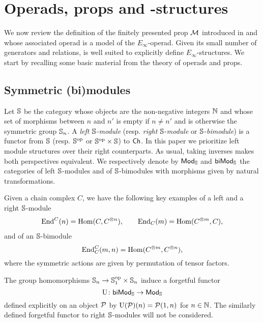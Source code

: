 \section{Operads, props and \pdfEinfty-structures} \label{s:props}

We now review the definition of the finitely presented prop $\mathcal{M}$ introduced in \cite{medina2020prop1} and whose associated operad is a model of the $E_\infty$-operad.
Given its small number of generators and relations, is well suited to explicitly define $E_\infty$-structures.
We start by recalling some basic material from the theory of operads and props.

\subsection{Symmetric (bi)modules}

Let $\mathbb{S}$ be the category whose objects are the non-negative integers $\mathbb{N}$ and whose set of morphisms between $n$ and $n'$ is empty if $n \neq n'$ and is otherwise the symmetric group $\mathbb{S}_n$.
A \textit{left $\mathbb{S}$-module} (resp. \textit{right} $\mathbb{S}$-\textit{module} or $\mathbb{S}$-\textit{bimodule}) is a functor from $\mathbb{S}$ (resp. $\mathbb{S}^{\mathrm{op}}$ or $\mathbb{S}^{\mathrm{op}} \times \mathbb{S}$) to $\mathsf{Ch}$.
In this paper we prioritize left module structures over their right counterparts.
As usual, taking inverses makes both perspectives equivalent.
We respectively denote by $\mathsf{Mod}_{\mathbb{S}}$ and $\mathsf{biMod}_{\mathbb{S}}$ the categories of left $\mathbb{S}$-modules and of $\mathbb{S}$-bimodules with morphisms given by natural transformations.

Given a chain complex $C$, we have the following key examples of a left and a right $\mathbb{S}$-module
\begin{gather*}
	\mathrm{End}^C(n) = \mathrm{Hom}(C, C^{\otimes n}), \qquad
	\mathrm{End}_C(m) = \mathrm{Hom}(C^{\otimes m}, C),
\end{gather*}
and of an $\mathbb{S}$-bimodule
\[
\mathrm{End}^C_C(m,n) = \mathrm{Hom}(C^{\otimes m}, C^{\otimes n}),
\]
where the symmetric actions are given by permutation of tensor factors.

The group homomorphisms $\mathbb{S}_n \to \mathbb{S}_1^{\mathrm{op}} \times \mathbb{S}_n$ induce a forgetful functor
\begin{equation} \label{e:forgetful}
	\operatorname{U} \colon \mathsf{biMod}_{\mathbb{S}} \to \mathsf{Mod}_{\mathbb{S}}
\end{equation}
defined explicitly on an object $\mathcal{P}$ by $\operatorname{U}(\mathcal{P})(n) = \mathcal{P}(1, n)$ for $n \in \mathbb{N}$.
The similarly defined forgetful functor to right $\mathbb{S}$-modules will not be considered.

